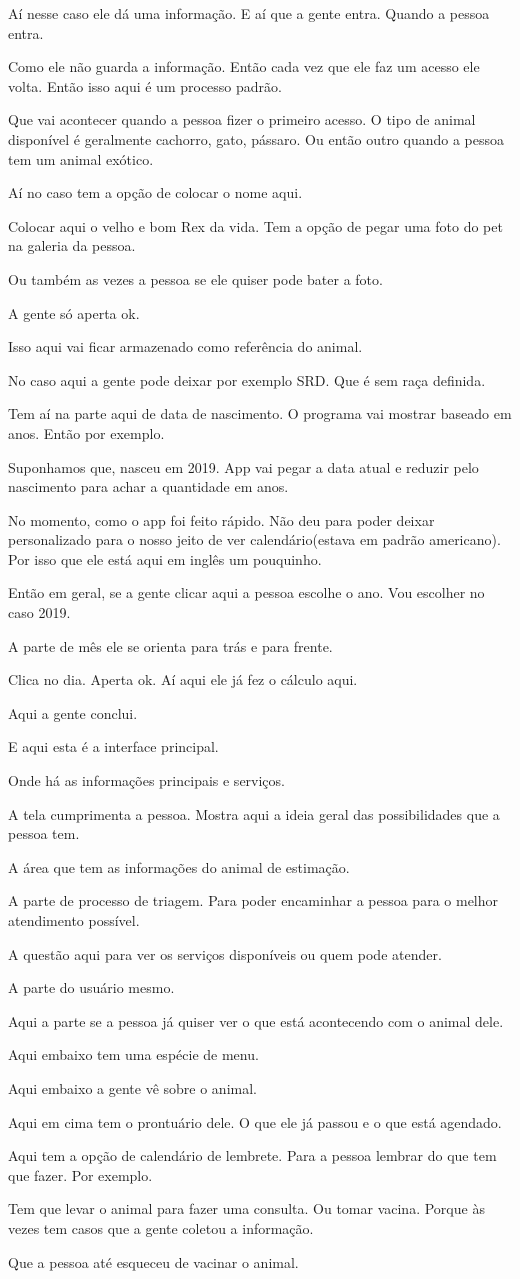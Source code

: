 \documentclass[12pt,a4paper]{article}
\newenvironment{turnos}{\begin{list}{}{\setlength{\leftmargin}{2.2cm}\setlength{\labelwidth}{2.0cm}\setlength{\labelsep}{0.2cm}\setlength{\itemsep}{0.45em}\setlength{\parsep}{0pt}}}{\end{list}}
\newcommand{\fala}[1]{\item[\textbf{#1}\hfill]}
\begin{document}
\begin{turnos}
\fala{E:} Aí nesse caso ele dá uma informação. E aí que a gente entra. Quando a pessoa entra.
\fala{E:} Como ele não guarda a informação. Então cada vez que ele faz um acesso ele volta. Então isso aqui é um processo padrão.
\fala{E:} Que vai acontecer quando a pessoa fizer o primeiro acesso. O tipo de animal disponível é geralmente cachorro, gato, pássaro. Ou então outro quando a pessoa tem um animal exótico.
\fala{E:} Aí no caso tem a opção de colocar o nome aqui. 
\fala{E:} Colocar aqui o velho e bom Rex da vida. Tem a opção de pegar uma foto do pet na galeria da pessoa.
\fala{E:} Ou também as vezes a pessoa se ele quiser pode bater a foto. 
\fala{E:} A gente só aperta ok.
\fala{E:} Isso aqui vai ficar armazenado como referência do animal. 
\fala{E:} No caso aqui a gente pode deixar por exemplo SRD. Que é sem raça definida.
\fala{E:} Tem aí na parte aqui de data de nascimento. O programa vai mostrar baseado em anos. Então por exemplo.
\fala{E:} Suponhamos que, nasceu em 2019. App vai pegar a data atual e reduzir pelo nascimento para achar a quantidade em anos. 
\fala{E:} No momento, como o app foi feito rápido. Não deu para poder deixar personalizado para o nosso jeito de ver calendário(estava em padrão americano). Por isso que ele está aqui em inglês um pouquinho.
\fala{E:} Então em geral, se a gente clicar aqui a pessoa escolhe o ano. Vou escolher no caso 2019. 
\fala{E:} A parte de mês ele se orienta para trás e para frente.
\fala{E:} Clica no dia. Aperta ok. Aí aqui ele já fez o cálculo aqui.
\fala{E:} Aqui a gente conclui. 
\fala{E:} E aqui esta é a interface principal. 
\fala{E:} Onde há as informações principais e serviços.
\fala{E:} A tela cumprimenta a pessoa. Mostra aqui a ideia geral das possibilidades que a pessoa tem. 
\fala{E:} A área que tem as informações do animal de estimação.
\fala{E:} A parte de processo de triagem. Para poder encaminhar a pessoa para o melhor atendimento possível. 
\fala{E:} A questão aqui para ver os serviços disponíveis ou quem pode atender.
\fala{E:} A parte do usuário mesmo. 
\fala{E:} Aqui a parte se a pessoa já quiser ver o que está acontecendo com o animal dele. 
\fala{E:} Aqui embaixo tem uma espécie de menu.
\fala{E:} Aqui embaixo a gente vê sobre o animal. 
\fala{E:} Aqui em cima tem o prontuário dele. O que ele já passou e o que está agendado.
\fala{E:} Aqui tem a opção de calendário de lembrete. Para a pessoa lembrar do que tem que fazer. Por exemplo.
\fala{E:} Tem que levar o animal para fazer uma consulta. Ou tomar vacina. Porque às vezes tem casos que a gente coletou a informação.
\fala{E:} Que a pessoa até esqueceu de vacinar o animal. 

\end{turnos}
\end{document}
